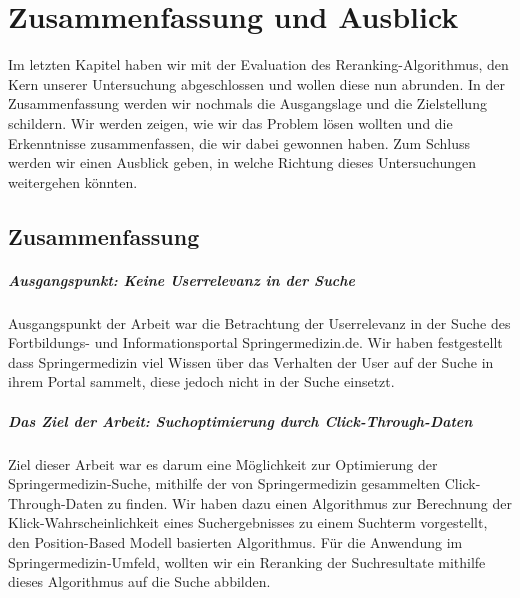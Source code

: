 %
\chapter{Zusammenfassung und Ausblick}
\label{sec:ZusammenfassungAusblick}

Im letzten Kapitel haben wir mit der Evaluation des Reranking-Algorithmus, den Kern unserer Untersuchung abgeschlossen und wollen diese nun abrunden. In der Zusammenfassung werden wir nochmals die Ausgangslage und die Zielstellung schildern. Wir werden zeigen, wie wir das Problem lösen wollten und die Erkenntnisse zusammenfassen, die wir dabei gewonnen haben. Zum Schluss werden wir einen Ausblick geben, in welche Richtung dieses Untersuchungen weitergehen könnten.

\section{Zusammenfassung}
\label{sec:ZusammenfassungAusblick:Zusammenfassung}

\paragraph{Ausgangspunkt: Keine Userrelevanz in der Suche}
Ausgangspunkt der Arbeit war die Betrachtung der Userrelevanz in der Suche des Fortbildungs- und Informationsportal Springermedizin.de. Wir haben festgestellt dass Springermedizin viel Wissen über das Verhalten der User auf der Suche in ihrem Portal sammelt, diese jedoch nicht in der Suche einsetzt. 

\paragraph{Das Ziel der Arbeit: Suchoptimierung durch Click-Through-Daten}
Ziel dieser Arbeit war es darum eine Möglichkeit zur Optimierung der Springermedizin-Suche, mithilfe der von Springermedizin gesammelten Click-Through-Daten zu finden. Wir haben dazu einen Algorithmus zur Berechnung der Klick-Wahrscheinlichkeit eines Suchergebnisses zu einem Suchterm vorgestellt, den Position-Based Modell basierten Algorithmus. Für die Anwendung im Springermedizin-Umfeld, wollten wir ein Reranking der Suchresultate mithilfe dieses Algorithmus auf die Suche abbilden.


